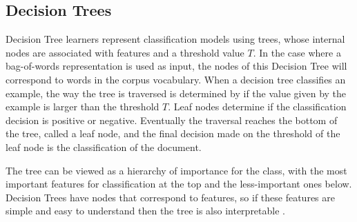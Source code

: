 


\subsection{Decision Trees}\label{bg:trees}

Decision Tree learners represent classification models using trees, whose internal nodes are associated with features and  a  threshold value $T$. In the case where a bag-of-words representation is used as input, the nodes of this Decision Tree will correspond to  words in the corpus vocabulary. When a decision tree classifies an example, the way the tree is traversed is determined by if the value given by the example is larger than the threshold $T$. Leaf nodes determine if the classification decision is positive or negative. Eventually the traversal reaches the bottom of the tree, called a leaf node, and the final  decision made on the threshold of the leaf node is the classification of the document. 

The tree can be viewed as a hierarchy of importance for the class, with the most important features for classification at the top and the less-important ones below. Decision Trees have nodes that correspond to features, so if these features are simple and easy to understand then the tree is also interpretable \cite{Ustun2014}. 




